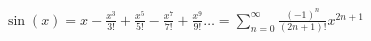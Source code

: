 \documentclass[preview]{standalone}
\begin{document}
\begin{align*}
\sin(x)= x-\frac{x^3}{3 !}+\frac{x^5}{5 !}-\frac{x^7}{7 !}+\frac{x^9}{9 !}\ldots =\sum_{n=0}^{\infty} \frac{(-1)^n}{(2 n+1) !} x^{2 n+1}
\end{align*}
\end{document}
